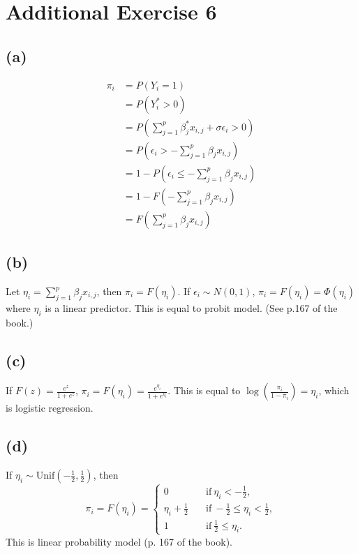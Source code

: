 \section*{Additional Exercise 6}
\subsection*{(a)}
\begin{align*}
\pi_{i} &= P\left(Y_{i} = 1\right)\\
&= P\left(Y_{i}^{*} > 0\right)\\
&= P\left(\sum_{j=1}^{p} \beta_{j}^{*} x_{i,j} + \sigma \epsilon_{i} > 0\right)\\
&= P\left(\epsilon_{i} > -\sum_{j=1}^{p} \beta_{j} x_{i,j}\right)\\
&= 1 - P\left(\epsilon_{i} \leq -\sum_{j=1}^{p} \beta_{j} x_{i,j}\right)\\
&= 1 - F\left(-\sum_{j=1}^{p} \beta_{j} x_{i,j}\right)\\
&= F\left(\sum_{j=1}^{p} \beta_{j} x_{i,j}\right)
\end{align*}


\subsection*{(b)}
Let $\eta_{i} = \sum_{j=1}^{p}\beta_{j} x_{i,j}$, then $\pi_{i} = F\left(\eta_{i}\right)$. If $\epsilon_{i} \sim N(0,1)$, $\pi_{i} = F\left(\eta_{i}\right) = \Phi\left(\eta_{i}\right)$ where $\eta_{i}$ is a linear predictor. This is equal to probit model. (See p.167 of the book.)


\subsection*{(c)}
If $F(z) = \frac{e^{z}}{1+e^{z}}$, $\pi_{i} = F\left(\eta_{i}\right) = \frac{e^{\eta_{i}}}{1+e^{\eta_{i}}}$. This is equal to $\log\left(\frac{\pi_{i}}{1-\pi_{i}} \right) = \eta_{i}$, which is logistic regression.


\subsection*{(d)}
If $\eta_{i} \sim \mathrm{Unif}\left(-\frac{1}{2},\frac{1}{2}\right)$, then 
$$\pi_{i} = F\left(\eta_{i}\right) =
\begin{cases}
0 & \quad \mbox{if}~ \eta_{i} < -\frac{1}{2},\\
\eta_{i} +\frac{1}{2} & \quad \mbox{if}~ -\frac{1}{2} \leq \eta_{i} < \frac{1}{2},\\
1 & \quad \mbox{if}~ \frac{1}{2} \leq \eta_{i}.
\end{cases}$$
This is linear probability model (p. 167 of the book).